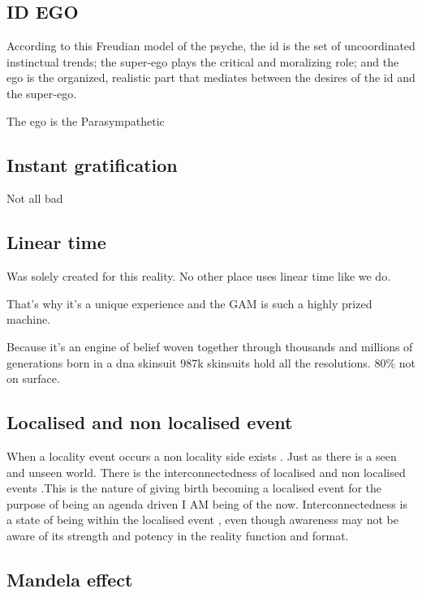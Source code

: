 \subsection{ID EGO}\label{id-ego}

According to this Freudian model of the psyche, the id is the set of
uncoordinated instinctual trends; the super-ego plays the critical and
moralizing role; and the ego is the organized, realistic part that
mediates between the desires of the id and the super-ego.

The ego is the Parasympathetic

\subsection{Instant gratification}\label{instant-gratification}

Not all bad

\subsection{Linear time}\label{linear-time}

Was solely created for this reality. No other place uses linear time
like we do.

That's why it's a unique experience and the GAM is such a highly prized
machine.

Because it's an engine of belief woven together through thousands and
millions of generations born in a dna skinsuit 987k skinsuits hold all
the resolutions. 80\% not on surface.

\subsection{Localised and non localised
event}\label{localised-and-non-localised-event}

When a locality event occurs a non locality side exists . Just as there
is a seen and unseen world. There is the interconnectedness of localised
and non localised events .This is the nature of giving birth becoming a
localised event for the purpose of being an agenda driven I AM being of
the now. Interconnectedness is a state of being within the localised
event , even though awareness may not be aware of its strength and
potency in the reality function and format.

\subsection{Mandela effect}\label{mandela-effect}

